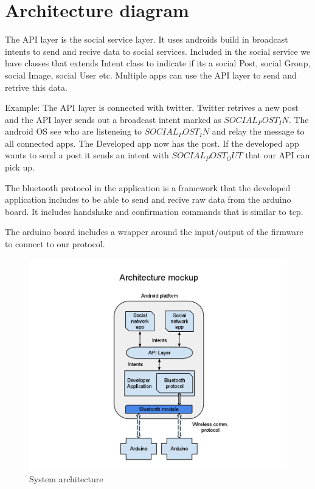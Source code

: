 \newpage
\section{Architecture diagram}
The API layer is the social service layer. It uses androids build in broadcast intents to send and recive data to social services. Included in the social service we have classes that extends Intent class to indicate if its a social Post, social Group, social Image, social User etc. Multiple apps can use the API layer to send and retrive this data. 

Example:
The API layer is connected with twitter. Twitter retrives a new post and the API layer sends out a broadcast intent marked as $SOCIAL_POST_IN$. The android OS see who are listeneing to $SOCIAL_POST_IN$ and relay the message to all connected apps. The Developed app now has the post. If the developed app wants to send a post it sends an intent with $SOCIAL_POST_OUT$ that our API can pick up.

The bluetooth protocol in the application is a framework that the developed application includes to be able to send and recive raw data from the arduino board. It includes handshake and confirmation commands that is similar to tcp.

The arduino board includes a wrapper around the input/output of the firmware to connect to our protocol. 
\begin{figure}[hb!]
\centering \includegraphics[scale=0.40]{img/architecture-diagram.png}
\caption{System architecture}
\label{fig:architecture}
\end{figure}

